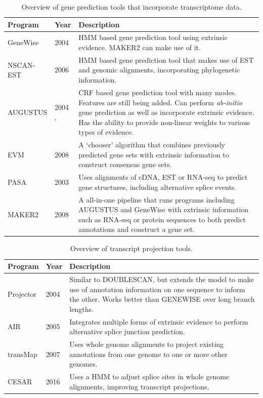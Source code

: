 \documentclass[fleqn,10pt]{wlscirep}
\begin{document}
\begin{table}[ht]
\centering
\begin{tabular}{|l|l|p{12cm}|}
\hline
Program & Year & Description \\
\hline
GeneWise & 2004 \cite{birney2004genewise} & HMM based gene prediction tool using extrinsic evidence. MAKER2 can make use of it. \\
\hline
NSCAN-EST & 2006 \cite{wei2006using} & HMM based gene prediction tool that makes use of EST and genomic alignments, incorporating phylogenetic information. \\
\hline
  AUGUSTUS & 2004 \cite{stanke2004augustus},\cite{stanke2006gene} & CRF based gene prediction tool with many modes. Features are still being added. Can perform \textit{ab-initio} gene prediction as well as incorporate extrinsic evidence. Has the ability to provide non-linear weights to various types of evidence. \\
\hline
EVM & 2008 \cite{haas2008automated,haas2013novo} & A `chooser' algorithm that combines previously predicted gene sets with extrinsic information to construct consensus gene sets. \\
\hline
PASA & 2003 \cite{haas2003improving} & Uses alignments of cDNA, EST or RNA-seq to predict gene structures, including alternative splice events. \\
\hline
MAKER2 & 2008 \cite{cantarel2008maker,yandell2012beginner} & A all-in-one pipeline that runs programs including AUGUSTUS and GeneWise with extrinsic information such as RNA-seq or protein sequences to both predict annotations and construct a gene set. \\
\hline
\end{tabular}
\caption{\label{tab:history_prediction}Overview of gene prediction tools that incorporate transcriptome data.}
\end{table}

\begin{table}[ht]
\centering
\begin{tabular}{|l|l|p{12cm}|}
\hline
Program & Year & Description \\
\hline
Projector & 2004 \cite{meyer2004gene} & Similar to DOUBLESCAN, but extends the model to make use of annotation information on one sequence to inform the other. Works better than GENEWISE over long branch lengths. \\
\hline
AIR & 2005 \cite{florea2005gene} & Integrates multiple forms of extrinsic evidence to perform alternative splice junction prediction. \\
\hline
transMap & 2007 \cite{stanke2008using} & Uses whole genome alignments to project existing annotations from one genome to one or more other genomes. \\
\hline
CESAR & 2016 \cite{sharma2016coding} & Uses a HMM to adjust splice sites in whole genome alignments, improving transcript projections. \\
\hline
\end{tabular}
\caption{\label{tab:history_comparative}Overview of transcript projection tools.}
\end{table}
\end{document}
